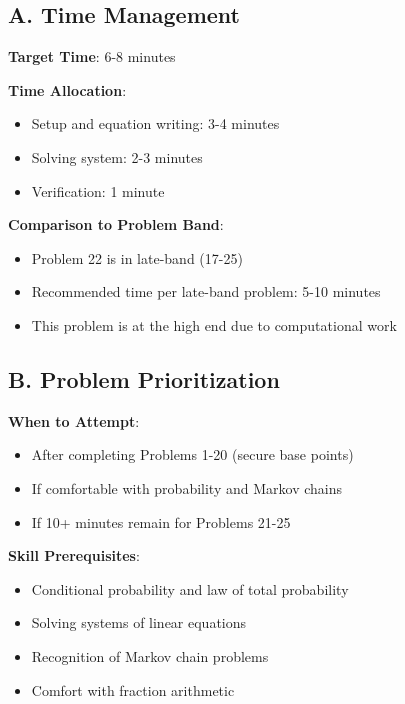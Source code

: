 \documentclass[12pt]{article}
\begin{document}
\begin{competitionbox}

\subsection*{A. Time Management}

\textbf{Target Time}: 6-8 minutes

\textbf{Time Allocation}:
\begin{itemize}[leftmargin=*]
    \item Setup and equation writing: 3-4 minutes
    \item Solving system: 2-3 minutes
    \item Verification: 1 minute
\end{itemize}

\textbf{Comparison to Problem Band}:
\begin{itemize}[leftmargin=*]
    \item Problem 22 is in late-band (17-25)
    \item Recommended time per late-band problem: 5-10 minutes
    \item This problem is at the high end due to computational work
\end{itemize}

\subsection*{B. Problem Prioritization}

\textbf{When to Attempt}:
\begin{itemize}[leftmargin=*]
    \item After completing Problems 1-20 (secure base points)
    \item If comfortable with probability and Markov chains
    \item If 10+ minutes remain for Problems 21-25
\end{itemize}

\textbf{Skill Prerequisites}:
\begin{itemize}[leftmargin=*]
    \item Conditional probability and law of total probability
    \item Solving systems of linear equations
    \item Recognition of Markov chain problems
    \item Comfort with fraction arithmetic
\end{itemize}


\end{competitionbox}
\end{document}
